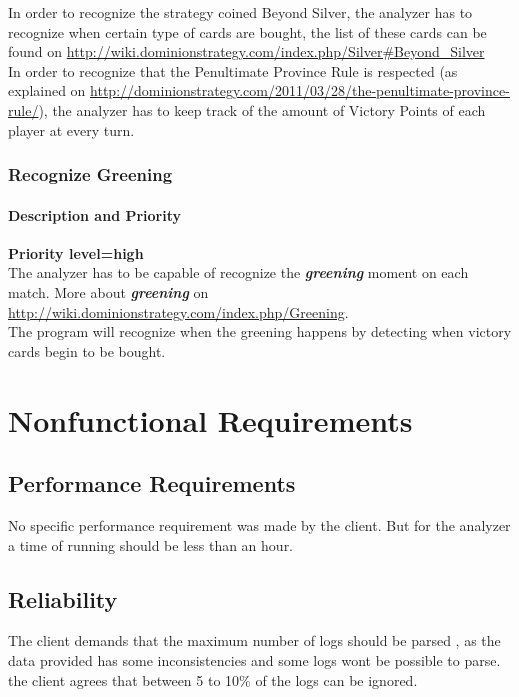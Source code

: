 \documentclass{scrreprt}
\begin{document}
In order to recognize the strategy coined Beyond Silver, the analyzer has to recognize when certain type of cards are bought, the list of these cards can be found on \url{http://wiki.dominionstrategy.com/index.php/Silver#Beyond_Silver}\\

In order to recognize that the Penultimate Province Rule is respected (as explained on \url{http://dominionstrategy.com/2011/03/28/the-penultimate-province-rule/}), the analyzer has to keep track of the amount of Victory Points of each player at every turn.

\subsection{Recognize Greening}
\subsubsection{Description and Priority}
\textbf{Priority level=high}\\
The analyzer has to be capable of recognize the \textit{\textbf{greening}} moment on each match.
More about \textit{\textbf{greening}} on \url{http://wiki.dominionstrategy.com/index.php/Greening}.\\
The program will recognize when the greening happens by detecting when victory cards begin to be bought.


\chapter{Nonfunctional Requirements}

\section{Performance Requirements}
No specific performance requirement was made by the client. But for the analyzer
a time of running should be less than an hour.



\section{Reliability}
The client demands that the maximum number of logs should be parsed , as the
data provided has some inconsistencies and some logs wont be possible to parse.
the client agrees that between 5 to 10\% of the logs can be ignored.\\
\end{document}
